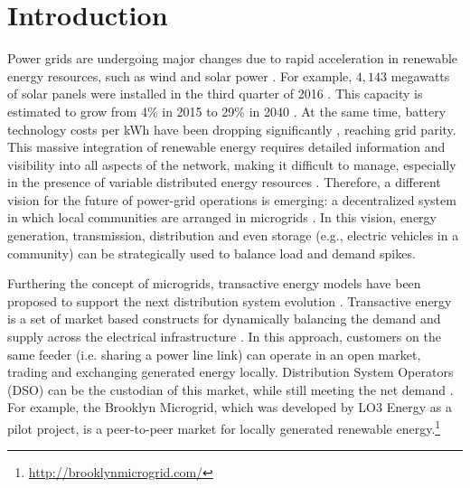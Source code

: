\section{Introduction}


Power grids are undergoing major changes due to rapid
acceleration in renewable energy resources, such as wind and solar power \cite{5430489}. %
For example, 
$4,\!143$ megawatts of solar panels were installed in the third quarter of 2016 \cite{seia}. This capacity is estimated to grow from 4\% in 2015 to 29\% in 2040 \cite{Randal}. At the same time, battery technology costs per kWh have been dropping significantly \cite{stock2015powerful}, reaching grid parity. %
This massive integration of renewable energy requires detailed information and visibility into all aspects of the network, making it difficult to manage, especially in the presence of variable distributed energy resources \cite{7452738}. Therefore, a different vision for the future of power-grid operations is emerging: a decentralized system in which local communities are arranged in microgrids \cite{rahimi2012transactive}. In this vision, energy generation, transmission, distribution and even storage (e.g., electric vehicles in a community) can be strategically used to balance load and demand spikes. 


Furthering the concept of microgrids, transactive energy models have been proposed to support the next distribution system evolution \cite{kok2016society,cox2013structured,melton2013gridwise}. Transactive energy is a set of market based constructs for dynamically balancing the demand and supply across the electrical infrastructure \cite{melton2013gridwise}. In this approach, customers on the same feeder (i.e. sharing a power line link) can operate in an open market, trading and exchanging generated energy locally. Distribution System Operators (DSO) can be the custodian of this market, while still meeting the net demand \cite{7462854}. For example, the Brooklyn Microgrid, which was developed by LO3 Energy as a pilot project, is a peer-to-peer market for locally generated renewable energy.\footnote{\url{http://brooklynmicrogrid.com/}}

